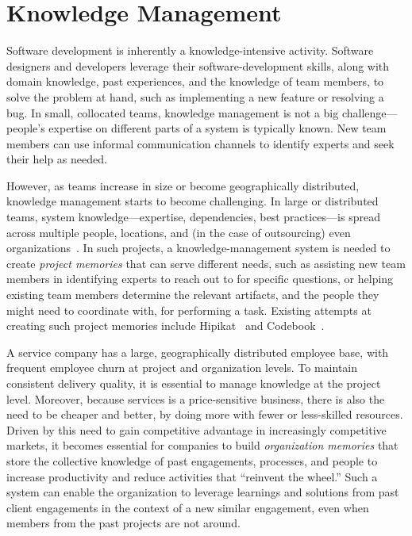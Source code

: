 
\section{Knowledge Management}
\label{sec:km}

Software development is inherently a knowledge-intensive activity. Software
designers and developers leverage their software-development skills, along with
domain knowledge, past experiences, and the knowledge of team members, to solve
the problem at hand, such as implementing a new feature or resolving a bug.  In
small, collocated teams, knowledge management is not a big challenge---people's
expertise on different parts of a system is typically known. New team members
can use informal communication channels to identify experts and seek their help
as needed.

However, as teams increase in size or become geographically distributed,
knowledge management starts to become challenging. In large or distributed
teams, system knowledge---\eg expertise, dependencies, best practices---is
spread across multiple people, locations, and (in the case of outsourcing) even
organizations~\cite{Desouza:2006}. In such projects, a knowledge-management
system is needed to create \textit{project memories} that can serve different
needs, such as assisting new team members in identifying experts to reach out to
for specific questions, or helping existing team members determine the relevant
artifacts, and the people they might need to coordinate with, for performing a
task. Existing attempts at creating such project memories include
Hipikat~\cite{Murphy:2005} and Codebook~\cite{Begel:2010}.


A service company has a large, geographically distributed employee base, with
frequent employee churn at project and organization levels. To maintain
consistent delivery quality, it is essential to manage knowledge at the project
level. Moreover, because services is a price-sensitive business, there is also
the need to be cheaper and better, by doing more with fewer or less-skilled
resources. Driven by this need to gain competitive advantage in increasingly
competitive markets, it becomes essential for companies to build
\textit{organization memories} that store the collective knowledge of past
engagements, processes, and people to increase productivity and reduce
activities that ``reinvent the wheel.'' Such a system can enable the
organization to leverage learnings and solutions from past client engagements in
the context of a new similar engagement, even when members from the past
projects are not around.

